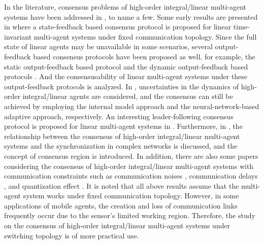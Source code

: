 \documentclass[12pt,draftcls,onecolumn]{IEEEtran}
\begin{document}
In the literature, consensus problems of high-order integral/linear multi-agent systems have been addressed in \cite{Xiao07IETCTA,Ma10TAC,Cheng11Automatica,Kim11TAC,Zhang12Automatica,Zhang11TAC,Li10TCASI,Yu11TCASI,Cheng12TAC,Tian12Automatica,You11TAC,
Wang08AJC,Jiang10IJC,Ni10SCL,Xu13IET,Su12TAC,Su12Automatica,Su12TSMCB}, to name a few. Some early results are presented in \cite{Xiao07IETCTA} where a state-feedback based consensus protocol is proposed for linear time-invariant multi-agent systems under fixed communication topology. Since the full state of linear agents may be unavailable in some scenarios, several output-feedback based consensus protocols have been proposed as well, for example, the static output-feedback based protocol \cite{Ma10TAC} and the dynamic output-feedback based protocols \cite{Cheng11Automatica}. And the consensusability of linear multi-agent systems under these output-feedback protocols is analyzed. In \cite{Kim11TAC,Zhang12Automatica}, uncertainties in the dynamics of high-order integral/linear agents are considered, and the consensus can still be achieved by employing the internal model approach and the neural-network-based adaptive approach, respectively. An interesting leader-following consensus protocol is proposed for linear multi-agent systems in \cite{Zhang11TAC}. Furthermore, in \cite{Li10TCASI, Yu11TCASI}, the relationship between the consensus of high-order integral/linear multi-agent systems and the synchronization in complex networks is discussed, and the concept of consensus region is introduced. In addition, there are also some papers considering the consensus of high-order integral/linear multi-agent systems with communication constraints such as communication noises \cite{Cheng12TAC}, communication delays \cite{Tian12Automatica}, and quantization effect \cite{You11TAC}. It is noted that all above results assume that the multi-agent system works under fixed communication topology. However, in some applications of mobile agents, the creation and loss of communication links frequently occur due to the sensor's limited working region. Therefore, the study on the consensus of high-order integral/linear multi-agent systems under switching topology is of more practical use.
\end{document}
